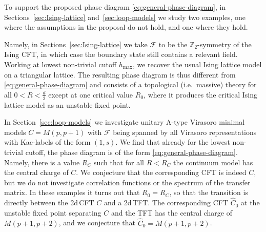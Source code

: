 \documentclass[11pt,a4paper]{article}
\numberwithin{equation}{section}
\begin{document}
\smallskip

To support the proposed phase diagram \eqref{eq:general-phase-diagram}, 
in Sections~\ref{sec:Ising-lattice} and~\ref{sec:loop-models} we study two examples, one where the assumptions in the proposal do not hold, and one where they hold. 

Namely, in Sections~\ref{sec:Ising-lattice} we take $\mathcal{F}$ to be the $\mathbb{Z}_2$-symmetry of the Ising CFT, in which case the boundary state still contains a relevant field. Working at lowest non-trivial cutoff $h_\mathrm{max}$, we recover the usual Ising lattice model on a triangular lattice. 
The resulting phase diagram is thus different from \eqref{eq:general-phase-diagram} and consists of a topological (i.e.\ massive) theory for all $0<R<\frac d2$ except at one critical value $R_0$, where it produces the critical Ising lattice model as an unstable fixed point.

In Section~\ref{sec:loop-models} we investigate unitary A-type Virasoro minimal models $C = M(p,p+1)$ with $\mathcal{F}$ being spanned by all Virasoro representations with Kac-labels of the form $(1,s)$. We find that already for the lowest non-trivial cutoff, the phase diagram is of the form \eqref{eq:general-phase-diagram}. Namely, there is a value $R_C$ such that for all $R<R_C$ the continuum model has the central charge of $C$. We conjecture that the corresponding CFT is indeed $C$, but we do not investigate correlation functions or the spectrum of the transfer matrix.
In these examples it turns out that $R_0=R_C$, so that the transition is directly between the 2d\,CFT $C$ and a 2d\,TFT. The corresponding CFT $\widehat C_0$ at the unstable fixed point separating $C$ and the TFT has the central charge of $M(p+1,p+2)$, and we conjecture that $\widehat C_0 = M(p+1,p+2)$.
\end{document}
